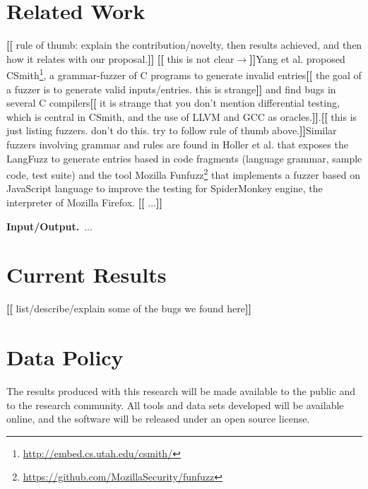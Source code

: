 \documentclass[11pt]{article}
\newcommand{\Fix}[1]{\textbf{[[}{\color{red} #1}\textbf{]]}}
\newcommand{\Mar}[1]{\textbf{[[}{\color{blue} #1}\textbf{]]}}
\begin{document}
\section{Related Work}

\Mar{rule of thumb: explain the
  contribution/novelty, then results achieved, and then how it relates
with our proposal.}
\Mar{this is not clear$\rightarrow$}Yang et al. \cite{yang-2011-finding} proposed CSmith\footnote{\url{http://embed.cs.utah.edu/csmith/}}, a grammar-fuzzer 
of C programs to generate invalid entries\Fix{the goal of a
  fuzzer is to generate valid inputs/entries. this is strange} and
find bugs in several C compilers\Fix{it is strange that you don't mention differential
  testing, which is central in CSmith, and the use of LLVM and GCC as
  oracles.}.\Mar{this is just listing fuzzers. don't do this. try to
  follow rule of thumb above.}Similar fuzzers involving grammar and rules are found in Holler et al. \cite{holler-2012-fuzzing} 
that exposes the LangFuzz to generate entries based in code fragments 
(language grammar, sample code, test suite) and the tool Mozilla 
Funfuzz\footnote{\url{https://github.com/MozillaSecurity/funfuzz}}
that implements a fuzzer based on JavaScript language to improve the 
testing for SpiderMonkey engine, the interpreter of Mozilla Firefox.
\Fix{...}



\vspace{1ex}\noindent\textbf{Input/Output.}~...

\section{Current Results}
\label{sec:results}

\Fix{list/describe/explain some of the bugs we found here}

\section{Data Policy}

The results produced with this research will be made available to the
public and to the research community.  All tools and data sets
developed will be available online, and the software will be released
under an open source license.


\footnotesize


\end{document}
